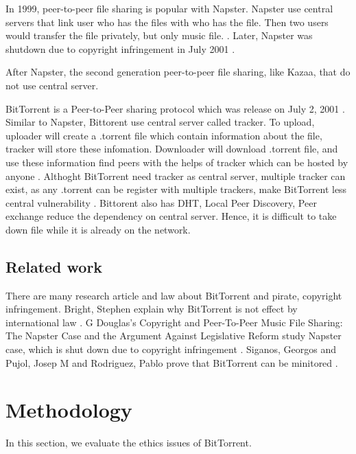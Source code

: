 \documentclass[conference]{IEEEtran}
\begin{document}
In 1999, peer-to-peer file sharing is popular with Napster. Napster use central servers that link user who has the files with who has the file. Then two users would transfer the file privately, but only music file. \cite{tyson2005old}. Later, Napster was shutdown due to copyright infringement in July 2001 \cite{douglas2004copyright}.

After Napster, the second generation peer-to-peer file sharing, like Kazaa, that do not use central server. \cite{watson2008kazaa}  


BitTorrent is a Peer-to-Peer sharing protocol which was release on July 2, 2001 \cite{cohen2001bittorrent}. Similar to Napster, Bittorent use central server called tracker\cite{HowP2PWorks}. To upload, uploader will create a .torrent file which contain information about the file, tracker will store these infomation. Downloader will download .torrent file, and use these information find peers with the helps of tracker which can be hosted by anyone \cite{HowP2PWorks}. Althoght BitTorrent need tracker as central server, multiple  tracker can exist, as any .torrent can be register with multiple trackers, make BitTorrent less central vulnerability \cite{HowP2PWorks}. Bittorent also has DHT, Local Peer Discovery, Peer exchange reduce the dependency on central server. Hence, it is difficult to take down file while it is already on the network.   




\subsection{Related work}
There are many research article and law about BitTorrent and pirate, copyright infringement. Bright, Stephen explain why BitTorrent is not effect by international law \cite{bright2011current}. G Douglas's Copyright and Peer-To-Peer Music File Sharing: The Napster Case and the Argument Against Legislative Reform study Napster case, which is shut down due to copyright infringement \cite{douglas2004copyright}. Siganos, Georgos and Pujol, Josep M and Rodriguez, Pablo prove that BitTorrent can be minitored \cite{siganos2009monitoring}.

\section{Methodology} \label{method}
In this section, we evaluate the ethics issues of BitTorrent.
\end{document}
